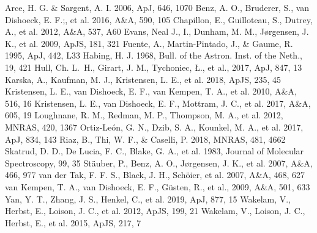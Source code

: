 \documentclass[a4paper]{article}
\renewenvironment{thebibliography}[1]{\begin{oldthebibliography}{#1}\setlength{\parskip}{0ex}\setlength{\itemsep}{0ex}}{\end{oldthebibliography}}
\begin{document}
\begin{thebibliography}{20}
{\small
{} Arce, H. G. \& Sargent, A. I. 2006, ApJ, 646, 1070
 Benz, A. O., Bruderer, S., van Dishoeck, E. F.;, et al. 2016, A\&A, 590, 105
 Chapillon, E., Guilloteau, S., Dutrey, A., et al. 2012, A\&A, 537, A60
 Evans, Neal J., I., Dunham, M. M., Jørgensen, J. K., et al. 2009, ApJS, 181, 321
 Fuente, A., Martin-Pintado, J., \& Gaume, R. 1995, ApJ, 442, L33
 Habing, H. J. 1968, Bull. of the Astron. Inst. of the Neth., 19, 421
 Hull, Ch. L.~H., Girart, J. M., Tychoniec, Ł., et al., 2017, ApJ, 847, 13 
 Karska, A., Kaufman, M. J., Kristensen, L. E., et al. 2018, ApJS, 235, 45
 Kristensen, L. E., van Dishoeck, E. F., van Kempen, T. A., et al. 2010, A\&A, 516, 16
 Kristensen, L. E., van Dishoeck, E. F., Mottram, J. C., et al. 2017, A\&A, 605, 19
 Loughnane, R. M., Redman, M. P., Thompson, M. A., et al. 2012, MNRAS, 420, 1367
 Ortiz-León, G. N., Dzib, S. A., Kounkel, M. A., et al. 2017, ApJ, 834, 143
 Riaz, B., Thi, W. F., \& Caselli, P. 2018, MNRAS, 481, 4662
 Skatrud, D. D., De Lucia, F. C., Blake, G. A., et al. 1983, Journal of Molecular Spectroscopy, 99, 35
 Stäuber, P., Benz, A. O., Jørgensen, J. K., et al. 2007, A\&A, 466, 977 
 van der Tak, F. F. S., Black, J. H., Schöier, et al. 2007, A\&A, 468, 627
 van Kempen, T. A., van Dishoeck, E. F., Güsten, R., et al., 2009, A\&A, 501, 633
  Yan, Y. T., Zhang, J. S., Henkel, C., et al. 2019, ApJ, 877, 15
 Wakelam, V., Herbst, E., Loison, J. C., et al. 2012, ApJS, 199, 21
 Wakelam, V., Loison, J. C., Herbst, E., et al. 2015, ApJS, 217, 7
}
\end{thebibliography}
\end{document}
